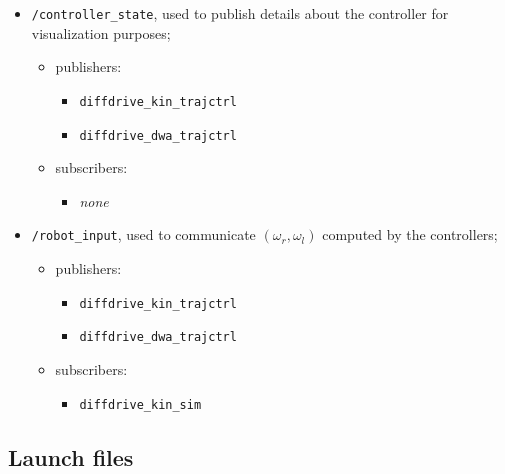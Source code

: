 \documentclass[11pt,a4paper]{article}
\begin{document}
\begin{itemize}
    \item \texttt{/controller\_state}, used to publish details about the controller for visualization purposes;
        \begin{itemize}
            \item publishers:
                \begin{itemize}
                    \item \texttt{diffdrive\_kin\_trajctrl}
                    \item \texttt{diffdrive\_dwa\_trajctrl}
                \end{itemize}
            \item subscribers:
                \begin{itemize}
                    \item \textit{none}
                \end{itemize}
        \end{itemize}

    \item \texttt{/robot\_input}, used to communicate $(\omega_r,\omega_l)$ computed by the controllers;
        \begin{itemize}
            \item publishers:
                \begin{itemize}
                    \item \texttt{diffdrive\_kin\_trajctrl}
                    \item \texttt{diffdrive\_dwa\_trajctrl}
                \end{itemize}
            \item subscribers:
                \begin{itemize}
                    \item \texttt{diffdrive\_kin\_sim}
                \end{itemize}
        \end{itemize}

\end{itemize}



\subsection{Launch files}
\end{document}
